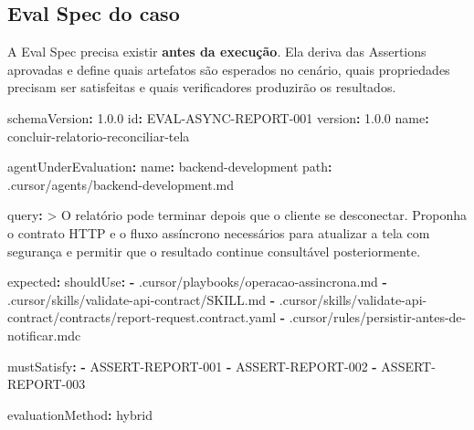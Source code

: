 \documentclass[
  10pt,
  a4paper,
  oneside]{book}
\newenvironment{Shaded}{}{}
\newcommand{\AttributeTok}[1]{\textcolor[rgb]{0.49,0.56,0.16}{#1}}
\newcommand{\CharTok}[1]{\textcolor[rgb]{0.25,0.44,0.63}{#1}}
\newcommand{\FloatTok}[1]{\textcolor[rgb]{0.25,0.63,0.44}{#1}}
\newcommand{\FunctionTok}[1]{\textcolor[rgb]{0.02,0.16,0.49}{#1}}
\newcommand{\KeywordTok}[1]{\textcolor[rgb]{0.00,0.44,0.13}{\textbf{#1}}}
\newcommand{\NormalTok}[1]{#1}
\renewenvironment{Shaded}{\begin{snugshade}}{\end{snugshade}}%
\begin{document}
\hypertarget{eval-spec-do-caso}{%
\subsection{Eval Spec do caso}\label{eval-spec-do-caso}}

A Eval Spec precisa existir \textbf{antes da execução}. Ela deriva das
Assertions aprovadas e define quais artefatos são esperados no cenário,
quais propriedades precisam ser satisfeitas e quais verificadores
produzirão os resultados.

\begin{Shaded}
\begin{Highlighting}[]
\FunctionTok{schemaVersion}\KeywordTok{:}\AttributeTok{ }\FloatTok{1.0.0}
\FunctionTok{id}\KeywordTok{:}\AttributeTok{ EVAL{-}ASYNC{-}REPORT{-}001}
\FunctionTok{version}\KeywordTok{:}\AttributeTok{ }\FloatTok{1.0.0}
\FunctionTok{name}\KeywordTok{:}\AttributeTok{ concluir{-}relatorio{-}reconciliar{-}tela}

\FunctionTok{agentUnderEvaluation}\KeywordTok{:}
\AttributeTok{  }\FunctionTok{name}\KeywordTok{:}\AttributeTok{ backend{-}development}
\AttributeTok{  }\FunctionTok{path}\KeywordTok{:}\AttributeTok{ .cursor/agents/backend{-}development.md}

\FunctionTok{query}\KeywordTok{: }\CharTok{\textgreater{}}
\NormalTok{  O relatório pode terminar depois que o cliente se desconectar.}
\NormalTok{  Proponha o contrato HTTP e o fluxo assíncrono necessários para}
\NormalTok{  atualizar a tela com segurança e permitir que o resultado}
\NormalTok{  continue consultável posteriormente.}

\FunctionTok{expected}\KeywordTok{:}
\AttributeTok{  }\FunctionTok{shouldUse}\KeywordTok{:}
\AttributeTok{    }\KeywordTok{{-}}\AttributeTok{ .cursor/playbooks/operacao{-}assincrona.md}
\AttributeTok{    }\KeywordTok{{-}}\AttributeTok{ .cursor/skills/validate{-}api{-}contract/SKILL.md}
\AttributeTok{    }\KeywordTok{{-}}\AttributeTok{ .cursor/skills/validate{-}api{-}contract/contracts/report{-}request.contract.yaml}
\AttributeTok{    }\KeywordTok{{-}}\AttributeTok{ .cursor/rules/persistir{-}antes{-}de{-}notificar.mdc}

\AttributeTok{  }\FunctionTok{mustSatisfy}\KeywordTok{:}
\AttributeTok{    }\KeywordTok{{-}}\AttributeTok{ ASSERT{-}REPORT{-}001}
\AttributeTok{    }\KeywordTok{{-}}\AttributeTok{ ASSERT{-}REPORT{-}002}
\AttributeTok{    }\KeywordTok{{-}}\AttributeTok{ ASSERT{-}REPORT{-}003}

\FunctionTok{evaluationMethod}\KeywordTok{:}\AttributeTok{ hybrid}


\end{Highlighting}
\end{Shaded}
\end{document}
